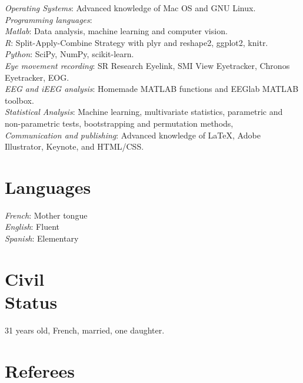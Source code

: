 \documentclass[margin,line]{resume}
\begin{document}
\begin{resume}
	\textsl{Operating Systems}: Advanced knowledge of Mac OS and GNU Linux.\\
	\textsl{Programming languages}: \\
		\phantom{1em} \textsl{Matlab}: Data analysis, machine learning and computer vision.\\
		\phantom{1em} \textsl{R}: Split-Apply-Combine Strategy with plyr and reshape2, ggplot2, knitr.\\
		\phantom{1em} \textsl{Python}: SciPy, NumPy, scikit-learn.\\
	\textsl{Eye movement recording}: SR Research Eyelink, SMI View Eyetracker, Chronos Eyetracker, EOG.\\
	\textsl{EEG and iEEG analysis}: Homemade MATLAB functions and EEGlab MATLAB toolbox.\\
	\textsl{Statistical Analysis}: Machine learning, multivariate statistics, parametric and non-parametric tests, bootstrapping and permutation methods, \\
	\textsl{Communication and publishing}: Advanced knowledge of \LaTeX, Adobe Illustrator, Keynote, and HTML/CSS.





\vspace{3mm}
    \section{\mysidestyle Languages}
	\textsl{French}: Mother tongue\\
	\textsl{English}: Fluent\\
	\textsl{Spanish}: Elementary

    \section{\mysidestyle Civil\\Status}
    31 years old, French, married, one daughter.	

\vspace{3mm}	
	\section{\mysidestyle Referees} 


\end{resume}
\end{document}
